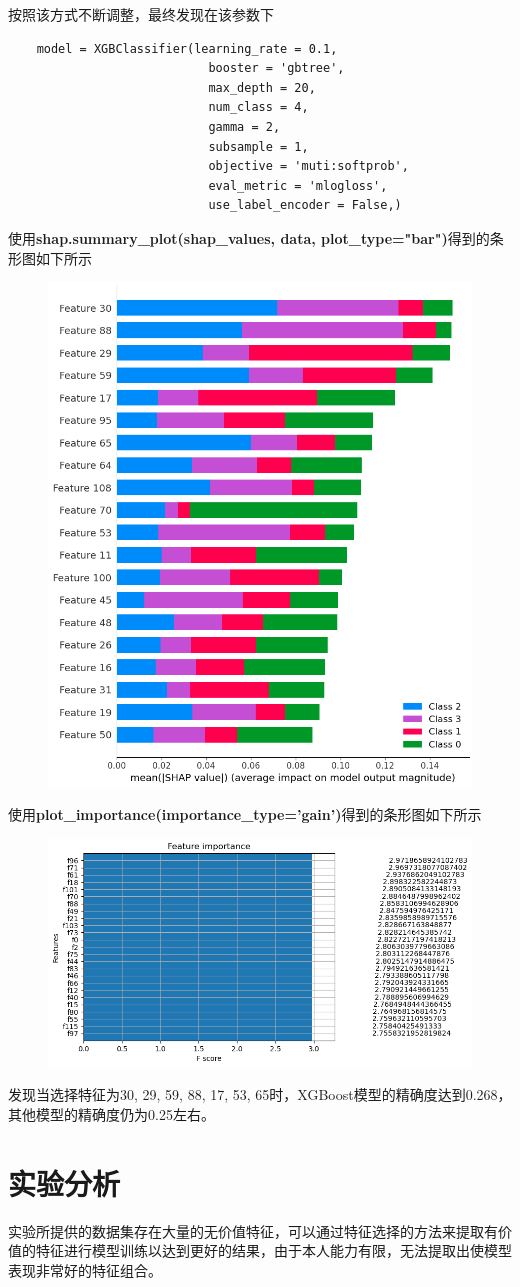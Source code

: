\documentclass[12pt, a4paper, oneside]{ctexart}
\begin{document}
按照该方式不断调整，最终发现在该参数下
\begin{lstlisting}
    model = XGBClassifier(learning_rate = 0.1,
                            booster = 'gbtree',
                            max_depth = 20,
                            num_class = 4,
                            gamma = 2,
                            subsample = 1,
                            objective = 'muti:softprob',
                            eval_metric = 'mlogloss',
                            use_label_encoder = False,)
\end{lstlisting}
使用\textbf{shap.summary\_plot(shap\_values, data, plot\_type="bar")}得到的条形图如下所示
\begin{figure}[H]
    \centering
    \includegraphics[scale=0.6]{9.png}
\end{figure}
使用\textbf{plot\_importance(importance\_type='gain')}得到的条形图如下所示
\begin{figure}[H]
    \centering
    \includegraphics[scale=0.6]{10.png}
\end{figure}
发现当选择特征为30, 29, 59, 88, 17, 53, 65时，XGBoost模型的精确度达到0.268，其他模型的精确度仍为0.25左右。
\section{实验分析}

实验所提供的数据集存在大量的无价值特征，可以通过特征选择的方法来提取有价值的特征进行模型训练以达到更好的结果，由于本人能力有限，无法提取出使模型表现非常好的特征组合。
\end{document}
